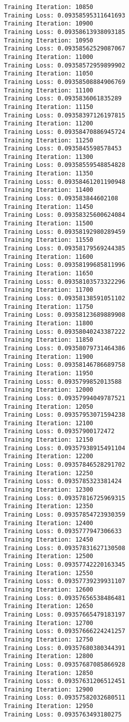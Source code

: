 \documentclass[11pt]{article}
\begin{document}
\begin{Verbatim}[commandchars=\\\{\}]
Training Iteration: 10850
Training Loss: 0.09358595311641693
Training Iteration: 10900
Training Loss: 0.09358613938093185
Training Iteration: 10950
Training Loss: 0.09358562529087067
Training Iteration: 11000
Training Loss: 0.09358572959899902
Training Iteration: 11050
Training Loss: 0.09358508884906769
Training Iteration: 11100
Training Loss: 0.0935836061835289
Training Iteration: 11150
Training Loss: 0.09358397126197815
Training Iteration: 11200
Training Loss: 0.09358470886945724
Training Iteration: 11250
Training Loss: 0.0935845598578453
Training Iteration: 11300
Training Loss: 0.09358559548854828
Training Iteration: 11350
Training Loss: 0.09358461201190948
Training Iteration: 11400
Training Loss: 0.093583844602108
Training Iteration: 11450
Training Loss: 0.09358325600624084
Training Iteration: 11500
Training Loss: 0.09358192980289459
Training Iteration: 11550
Training Loss: 0.09358179569244385
Training Iteration: 11600
Training Loss: 0.09358199685811996
Training Iteration: 11650
Training Loss: 0.09358103573322296
Training Iteration: 11700
Training Loss: 0.09358138591051102
Training Iteration: 11750
Training Loss: 0.09358123689889908
Training Iteration: 11800
Training Loss: 0.09358040243387222
Training Iteration: 11850
Training Loss: 0.09358079731464386
Training Iteration: 11900
Training Loss: 0.09358146786689758
Training Iteration: 11950
Training Loss: 0.0935799852013588
Training Iteration: 12000
Training Loss: 0.09357994049787521
Training Iteration: 12050
Training Loss: 0.09357953071594238
Training Iteration: 12100
Training Loss: 0.09357900172472
Training Iteration: 12150
Training Loss: 0.09357938915491104
Training Iteration: 12200
Training Loss: 0.09357846528291702
Training Iteration: 12250
Training Loss: 0.0935785323381424
Training Iteration: 12300
Training Loss: 0.09357816725969315
Training Iteration: 12350
Training Loss: 0.09357854723930359
Training Iteration: 12400
Training Loss: 0.0935777947306633
Training Iteration: 12450
Training Loss: 0.09357831627130508
Training Iteration: 12500
Training Loss: 0.09357742220163345
Training Iteration: 12550
Training Loss: 0.09357739239931107
Training Iteration: 12600
Training Loss: 0.09357656538486481
Training Iteration: 12650
Training Loss: 0.09357665479183197
Training Iteration: 12700
Training Loss: 0.09357666224241257
Training Iteration: 12750
Training Loss: 0.09357680380344391
Training Iteration: 12800
Training Loss: 0.09357687085866928
Training Iteration: 12850
Training Loss: 0.09357631206512451
Training Iteration: 12900
Training Loss: 0.09357582032680511
Training Iteration: 12950
Training Loss: 0.0935763493180275

\end{Verbatim}
\end{document}
